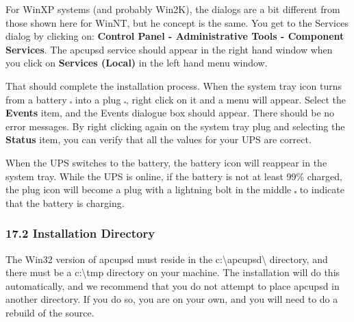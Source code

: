 {{{{{{{{{{For WinXP systems (and probably Win2K), the dialogs are a bit different from
those shown here for WinNT, but he concept is the same. You get to the
Services dialog by clicking on: {\bf Control Panel -\gt{} Administrative Tools
-\gt{} Component Services}. The apcupsd service should appear in the right
hand window when you click on {\bf Services (Local)} in the left hand menu
window.  

That should complete the installation process. When the system tray icon turns
from a battery \includegraphics{./onbatt.eps} into a plug
\includegraphics{./online.eps}, right click on it and a menu will appear.
Select the {\bf Events} item, and the Events dialogue box should appear. There
should be no error messages. By right clicking again on the system tray plug
and selecting the {\bf Status} item, you can verify that all the values for
your UPS are correct.  

When the UPS switches to the battery, the battery icon will reappear in the
system tray. While the UPS is online, if the battery is not at least 99\%
charged, the plug icon will become a plug with a lightning bolt in the middle
\includegraphics{./charging.eps} to indicate that the battery is charging. 

\label{Installation-Directory}

\subsubsection*{17.2 Installation Directory}

\label{index-Windows_002c-Installation-Directory-172}
The Win32 version of apcupsd must reside in the
c:\textbackslash{}apcupsd\textbackslash{} directory, and there must be a
c:\textbackslash{}tmp directory on your machine. The installation will do this
automatically, and we recommend that you do not attempt to place apcupsd in
another directory. If you do so, you are on your own, and you will need to do
a rebuild of the source. 

\label{Testing}

}}}}}}}}}}
